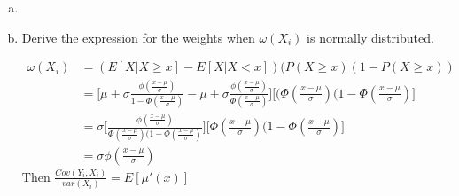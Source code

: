 \documentclass[11pt]{article}
\begin{document}
\begin{enumerate}[a)]

	\item

	\item Derive the expression for the weights when $\omega (X_i)$ is normally distributed.

	\begin{align*}
	\omega(X_i) &= ( E[X | X \geq x] - E[X | X < x] ) (P(X \geq x) ( 1 - P(X \geq x)) \\
	&=\bigg[ \mu + \sigma \frac{\phi (\frac{x - \mu}{\sigma})}{1 - \Phi( \frac{x - \mu}{\sigma})} - \mu + \sigma \frac{\phi (\frac{x - \mu}{\sigma})}{\Phi( \frac{x - \mu}{\sigma})} \bigg] \bigg[(\Phi( \frac{x - \mu}{\sigma})(1- \Phi( \frac{x - \mu}{\sigma}) \bigg] \\
	&=\sigma \bigg[\frac{ \phi( \frac{x - \mu}{\sigma}) }{\Phi( \frac{x - \mu}{\sigma})(1- \Phi( \frac{x - \mu}{\sigma})} \bigg] \bigg[\Phi( \frac{x - \mu}{\sigma})(1- \Phi( \frac{x - \mu}{\sigma})\bigg] \\
	&=\sigma \phi( \frac{x - \mu}{\sigma})
	\end{align*}
	\medskip
	Then $\frac{Cov(Y_i, X_i)}{var(X_i)} = E[\mu ' (x)]$

\end{enumerate}
\end{document}
